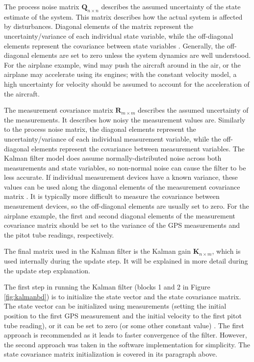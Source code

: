 \documentclass[12pt,a4paper]{report}
\begin{document}
The process noise matrix \(\mathbf{Q}_{n \times n}\) describes the assumed uncertainty of the state estimate of the system. This matrix describes how the actual system is affected by disturbances. Diagonal elements of the matrix represent the uncertainty/variance of each individual state variable, while the off-diagonal elements represent the covariance between state variables \cite{kfsimply}. Generally, the off-diagonal elements are set to zero unless the system dynamics are well understood. For the airplane example, wind may push the aircraft around in the air, or the airplane may accelerate using its engines; with the constant velocity model, a high uncertainty for velocity should be assumed to account for the acceleration of the aircraft. 

The measurement covariance matrix \(\mathbf{R}_{m \times m}\) describes the assumed uncertainty of the measurements. It describes how noisy the measurement values are. Similarly to the process noise matrix, the diagonal elements represent the uncertainty/variance of each individual measurement variable, while the off-diagonal elements represent the covariance between measurement variables. The Kalman filter model does assume normally-distributed noise across both measurements and state variables, so non-normal noise can cause the filter to be less accurate. If individual measurement devices have a known variance, these values can be used along the diagonal elements of the measurement covariance matrix \cite{kfsimply}. It is typically more difficult to measure the covariance between measurement devices, so the off-diagonal elements are usually set to zero. For the airplane example, the first and second diagonal elements of the measurement covariance matrix should be set to the variance of the GPS measurements and the pitot tube readings, respectively.

The final matrix used in the Kalman filter is the Kalman gain \(\mathbf{K}_{n \times m}\), which is used internally during the update step. It will be explained in more detail during the update step explanation.

The first step in running the Kalman filter (blocks 1 and 2 in Figure \ref{fig:kalmanbd}) is to initialize the state vector and the state covariance matrix. The state vector can be initialized using measurements (setting the initial position to the first GPS measurement and the initial velocity to the first pitot tube reading), or it can be set to zero (or some other constant value) \cite{kfsimply}. The first approach is recommended as it leads to faster convergence of the filter. However, the second approach was taken in the software implementation for simplicity. The state covariance matrix initialization is covered in its paragraph above.
\end{document}
